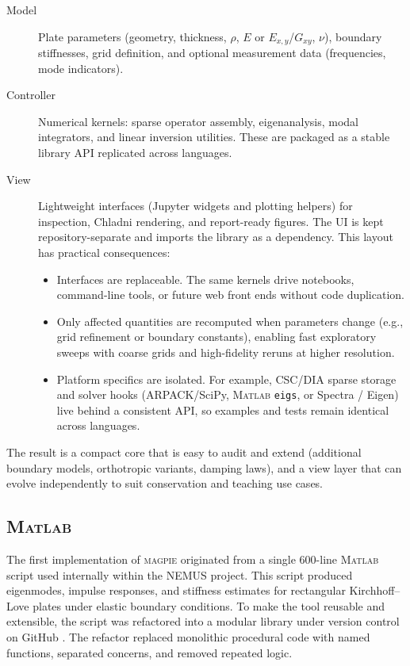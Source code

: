 \begin{description}
  \item[Model] Plate parameters (geometry, thickness, $\rho$, $E$ or $E_{x,y}$/$G_{xy}$, $\nu$), boundary stiffnesses, grid definition, and optional measurement data (frequencies, mode indicators).
  \item[Controller] Numerical kernels: sparse operator assembly, eigenanalysis, modal integrators, and linear inversion utilities. These are packaged as a stable library API replicated across languages.
  \item[View] Lightweight interfaces (Jupyter widgets and plotting helpers) for inspection, Chladni rendering, and report-ready figures. The UI is kept repository-separate and imports the library as a dependency. This layout has practical consequences: \begin{itemize}
  \item Interfaces are replaceable. The same kernels drive notebooks, command-line tools, or future web front ends without code duplication.
  \item Only affected quantities are recomputed when parameters change (e.g., grid refinement or boundary constants), enabling fast exploratory sweeps with coarse grids and high-fidelity reruns at higher resolution.
  \item Platform specifics are isolated. For example, CSC/DIA sparse storage and solver hooks (ARPACK/SciPy, M\textsc{atlab} \texttt{eigs}, or Spectra / Eigen) live behind a consistent API, so examples and tests remain identical across languages.
\end{itemize}
\end{description}
The result is a compact core that is easy to audit and extend (additional boundary models, orthotropic variants, damping laws), and a view layer that can evolve independently to suit conservation and teaching use cases.


\subsection{M\textsc{atlab}}

The first implementation of \textsc{magpie} originated from a single 600-line M\textsc{atlab} script used internally within the NEMUS project. This script produced eigenmodes, impulse responses, and stiffness estimates for rectangular Kirchhoff–Love plates under elastic boundary conditions. To make the tool reusable and extensible, the script was refactored into a modular library under version control on GitHub \cite{magpie_matlab_2025}. The refactor replaced monolithic procedural code with named functions, separated concerns, and removed repeated logic.

